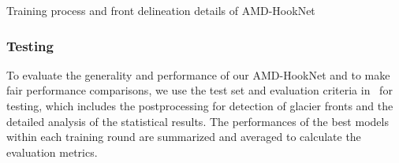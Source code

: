 \documentclass[lettersize,journal,siunitx]{IEEEtran}
\begin{document}
\begin{algorithm}[t]
\caption{Training process and front delineation details of AMD-HookNet}
\label{algo1}
\begin{algorithmic}[1]
\Else
{}
\EndIf
\EndFor
{}
\EndWhile
{}
\end{algorithmic}
\end{algorithm}

\subsubsection{Testing}
To evaluate the generality and performance of our AMD-HookNet and to make fair performance comparisons, we use the test set and evaluation criteria in~\cite{essd-14-4287-2022} for testing, which includes the postprocessing for detection of glacier fronts and the detailed analysis of the statistical results. The performances of the best models within each training round are summarized and averaged to calculate the evaluation metrics.
\end{document}
